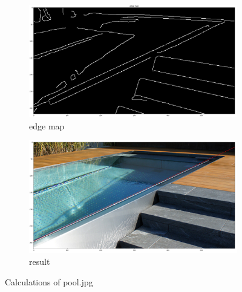 \documentclass[12pt]{article}
\begin{document}
\begin{figure}[!htb]
  \centering
  \begin{subfigure}{.5\textwidth}
    \centering
    \includegraphics[width=0.95\linewidth]{pics/poolEdgeMap}
    \caption{edge map}
  \end{subfigure}%
  \begin{subfigure}{.5\textwidth}
    \centering
    \includegraphics[width=0.95\linewidth]{pics/pool}
    \caption{result}
   \end{subfigure}
  \caption{Calculations of pool.jpg}
\end{figure}

\pagebreak
\end{document}
